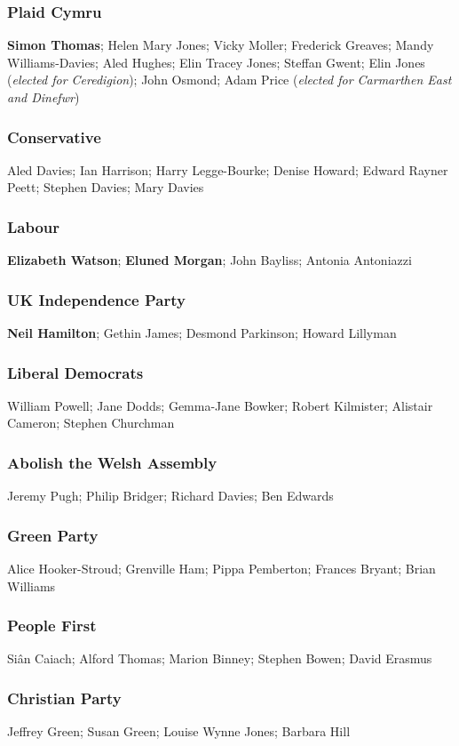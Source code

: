 \begin{resultsiii}
\subsubsection*{Plaid Cymru}
\textbf{Simon Thomas}; Helen Mary Jones; Vicky Moller; Frederick Greaves; Mandy Williams-Davies; Aled Hughes; Elin Tracey Jones; Steffan Gwent; Elin Jones (\emph{elected for Ceredigion}); John Osmond; Adam Price (\emph{elected for Carmarthen East and Dinefwr})
\subsubsection*{Conservative}
Aled Davies; Ian Harrison; Harry Legge-Bourke; Denise Howard; Edward Rayner Peett; Stephen Davies; Mary Davies
\subsubsection*{Labour}
\textbf{Elizabeth Watson}; \textbf{Eluned Morgan}; John Bayliss; Antonia Antoniazzi
\subsubsection*{UK Independence Party}
\textbf{Neil Hamilton}; Gethin James; Desmond Parkinson; Howard Lillyman
\subsubsection*{Liberal Democrats}
William Powell; Jane Dodds; Gemma-Jane Bowker; Robert Kilmister; Alistair Cameron; Stephen Churchman
\subsubsection*{Abolish the Welsh Assembly}
Jeremy Pugh; Philip Bridger; Richard Davies; Ben Edwards
\subsubsection*{Green Party}
Alice Hooker-Stroud; Grenville Ham; Pippa Pemberton; Frances Bryant; Brian Williams
\subsubsection*{People First}
Siân Caiach; Alford Thomas; Marion Binney; Stephen Bowen; David Erasmus
\subsubsection*{Christian Party}
Jeffrey Green; Susan Green; Louise Wynne Jones; Barbara Hill

\end{resultsiii}
